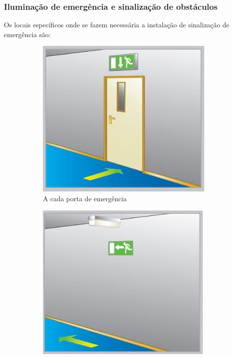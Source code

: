 \subsubsection{Iluminação de emergência e sinalização de obstáculos}
	\lipsum[1-1]


	Os locais específicos onde se fazem necessária a instalação de sinalização de emergência são:
	
	\begin{figure}[H]
		\centering
		\begin{subfigure}[b]{0.3\textwidth}
			\centering
			\includegraphics[width=\textwidth]{Figures/3. Lighting/light-safety1.jpg}
			\caption{A cada porta de emergência}
			\label{fig: style 1 image a}
		\end{subfigure}
		\hfill
		\begin{subfigure}[b]{0.3\textwidth}
			\centering
			\includegraphics[width=\textwidth]{Figures/3. Lighting/light-safety2.jpg}

\end{subfigure}
\end{figure}
